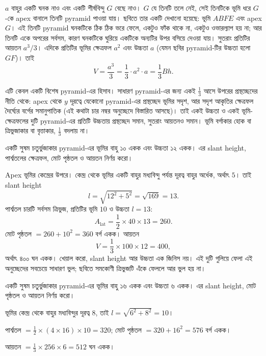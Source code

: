 \documentclass[11pt]{article}
\begin{document}
$a$ বাহুর একটি ঘনক নাও এবং একটি শীর্ষবিন্দু $G$ বেছে নাও। $G$ যে তিনটি তলে নেই,
সেই তিনটিকে ভূমি ধরে $G$-কে apex বানালে তিনটি pyramid পাওয়া যায়। ছবিতে তার একটি
দেখানো হয়েছে: ভূমি $ABFE$ এবং apex $G$। এই তিনটি pyramid ঘনকটিকে ঠিক ঠিক ভরে
ফেলে, একটুও ফাঁক থাকে না, একটুও ওভারল্যাপ হয় না; আর তিনটি একে অপরের সর্বসম, কারণ
ঘনকটিকে ঘুরিয়ে একটিকে অন্যটির উপর বসিয়ে দেওয়া যায়। সুতরাং প্রতিটির আয়তন
$a^{3}/3$। এদিকে প্রতিটির ভূমির ক্ষেত্রফল $a^{2}$ এবং উচ্চতা $a$ (যেমন ছবির
pyramid-টির উচ্চতা হলো $GF$)। তাই
\[
  V = \frac{a^{3}}{3} = \frac{1}{3} \cdot a^{2} \cdot a = \frac{1}{3} Bh .
\]

এটি কেবল একটি বিশেষ pyramid-এর হিসাব। সাধারণ pyramid-এর জন্য একই $\tfrac{1}{3}$
আসে উপরের প্রস্থচ্ছেদের নীতি থেকে: apex থেকে $y$ দূরত্বে যেকোনো pyramid-এর
প্রস্থচ্ছেদ ভূমির সদৃশ, আর সদৃশ আকৃতির ক্ষেত্রফল দৈর্ঘ্যের বর্গের সমানুপাতিক
(এই কথাটা চার নম্বর অনুচ্ছেদে বিস্তারিত আসছে)। তাই একই উচ্চতা ও একই ভূমি-ক্ষেত্রফলের
দুটি pyramid-এর প্রতিটি উচ্চতায় প্রস্থচ্ছেদ সমান, সুতরাং আয়তনও সমান। ভূমি
বর্গাকার হোক বা ত্রিভুজাকার বা বৃত্তাকার, $\tfrac{1}{3}$ বদলায় না।

\begin{example}
একটি সুষম চতুর্ভুজাকার pyramid-এর ভূমির বাহু ১০ একক এবং উচ্চতা ১২ একক। এর slant
height, পার্শ্বতলের ক্ষেত্রফল, মোট পৃষ্ঠতল ও আয়তন নির্ণয় করো।
\end{example}

\begin{solbox}
Apex ভূমির কেন্দ্রের উপরে। কেন্দ্র থেকে ভূমির একটি বাহুর মধ্যবিন্দু পর্যন্ত দূরত্ব
বাহুর অর্ধেক, অর্থাৎ $5$। তাই slant height
\[
  l = \sqrt{12^{2} + 5^{2}} = \sqrt{169} = 13 .
\]
পার্শ্বতল চারটি সর্বসম ত্রিভুজ, প্রতিটির ভূমি $10$ ও উচ্চতা $l = 13$:
\[
  A_{\mathrm{lat}} = \frac{1}{2} \times 40 \times 13 = 260 .
\]
মোট পৃষ্ঠতল $= 260 + 10^{2} = 360$ বর্গ একক। আয়তন
\[
  V = \frac{1}{3} \times 100 \times 12 = 400 ,
\]
অর্থাৎ ৪০০ ঘন একক।
খেয়াল করো, slant height আর উচ্চতা এক জিনিস নয়। এই দুটি গুলিয়ে ফেলা এই
অনুচ্ছেদের সবচেয়ে সাধারণ ভুল; ছবিতে সমকোণী ত্রিভুজটি এঁকে ফেললে আর ভুল হয় না।
\end{solbox}

 একটি সুষম চতুর্ভুজাকার pyramid-এর ভূমির বাহু ১৬ একক এবং উচ্চতা ৬ একক।
এর slant height, মোট পৃষ্ঠতল ও আয়তন নির্ণয় করো।

\begin{sol}
ভূমির কেন্দ্র থেকে বাহুর মধ্যবিন্দুর দূরত্ব $8$, তাই
$l = \sqrt{6^{2}+8^{2}} = 10$।

পার্শ্বতল $= \tfrac{1}{2} \times (4 \times 16) \times 10 = 320$;
মোট পৃষ্ঠতল $= 320 + 16^{2} = 576$ বর্গ একক।

আয়তন $= \tfrac{1}{3} \times 256 \times 6 = 512$ ঘন একক।
\end{sol}
\end{document}
